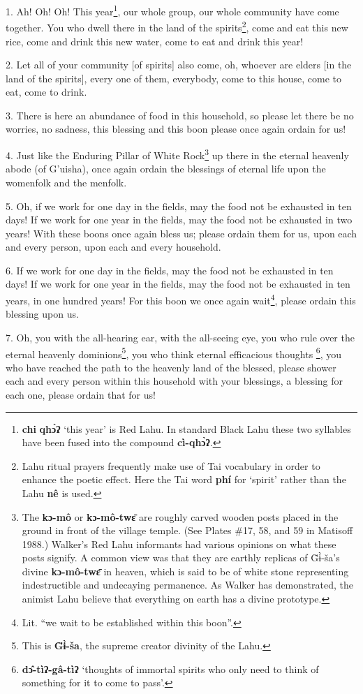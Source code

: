 \setcounter{footnote}{0}

1. Ah! Oh! Oh! This year\footnote{\textbf{chi} \textbf{qhɔ̀ʔ} `this year' is Red Lahu. In standard Black Lahu these two syllables have been fused into the compound \textbf{cì-qhɔ̀ʔ}.}, our whole group, our whole community have come together.
You who dwell there in the land of the spirits\footnote{Lahu ritual prayers frequently make use of Tai vocabulary in order to enhance the poetic effect. Here the Tai word \textbf{phí }for `spirit' rather than the Lahu \textbf{nê} is used.}, come and eat this new rice,
come and drink this new water, come to eat and drink this year!

2. Let all of your community [of spirits] also come, oh, whoever are elders [in
the land of the spirits], every one of them, everybody, come to this house, come
to eat, come to drink.

3. There is here an abundance of food in this household, so please let there be
no worries, no sadness, this blessing and this boon please once again ordain for
us!

4. Just like the Enduring Pillar of White Rock\footnote{The \textbf{kɔ-mô} or \textbf{kɔ-mô-twɛ̄} are roughly carved wooden posts placed in the ground in front of the village temple. (See Plates \#17, 58, and 59 in Matisoff 1988.) Walker's Red Lahu informants had various opinions on what these posts signify. A common view was that they are earthly replicas of G̈ɨ̀-ša's divine \textbf{kɔ-mô-twɛ̄} in heaven, which is said to be of white stone representing indestructible and undecaying permanence. As Walker has demonstrated, the animist Lahu believe that everything on earth has a divine prototype.} up there in the eternal heavenly
abode (of G'uisha), once again ordain the blessings of eternal life upon the womenfolk
and the menfolk.

5. Oh, if we work for one day in the fields, may the food not be exhausted in ten
days! If we work for one year in the fields, may the food not be exhausted in
two years! With these boons once again bless us; please ordain them for us, upon
each and every person, upon each and every household.

6. If we work for one day in the fields, may the food not be exhausted in ten days!
If we work for one year in the fields, may the food not be exhausted in ten years,
in one hundred years! For this boon we once again wait\footnote{Lit. ``we wait to be established within this boon''.}, please ordain this
blessing upon us.

7. Oh, you with the all-hearing ear, with the all-seeing eye, you who rule over
the eternal heavenly dominions\footnote{This is \textbf{G̈ɨ̀-ša}, the supreme creator divinity of the Lahu.}, you who think eternal efficacious thoughts
\footnote{\textbf{dɔ̂-tìʔ-gâ-tìʔ} `thoughts of immortal spirits who only need to think of something for it to come to pass'.}, you who have reached the path to the heavenly land of the blessed, please
shower each and every person within this household with your blessings, a blessing
for each one, please ordain that for us!

